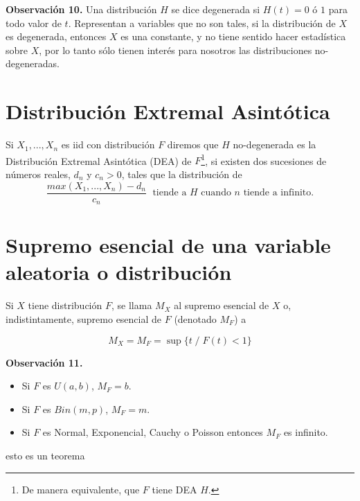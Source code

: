 \documentclass[
]{book}
\providecommand{\tightlist}{%
  \setlength{\itemsep}{0pt}\setlength{\parskip}{0pt}}
\theoremstyle{definition}
\theoremstyle{definition}
\theoremstyle{definition}
\theoremstyle{definition}
\theoremstyle{remark}
\begin{document}
\textbf{Observación 10.} Una distribución \(H\) se dice degenerada si \(H(t)=0 \text{ ó } 1\) para todo valor de \(t\). Representan a variables que no son tales, si la distribución de \(X\) es degenerada, entonces \(X\) es una constante, y no tiene sentido
hacer estadística sobre \(X\), por lo tanto sólo tienen
interés para nosotros las distribuciones no-degeneradas.

\section{Distribución Extremal Asintótica}\label{distribuciuxf3n-extremal-asintuxf3tica}

Si \(X_1,...,X_n\) es iid con distribución \(F\) diremos que \(H\) no-degenerada es la Distribución Extremal Asintótica
(DEA) de \(F\)\footnote{De manera equivalente, que \(F\) tiene DEA \(H\).}, si existen dos sucesiones de números reales, \(d_n\) y \(c_n>0\), tales que la distribución de
\begin{equation}
\frac{max(X_1,...,X_n)- d_n}{c_n}\;\text{ tiende a } H \text{ cuando } n \text{ tiende a infinito.}
\end{equation}

\section{Supremo esencial de una variable aleatoria o distribución}\label{supremo-esencial-de-una-variable-aleatoria-o-distribuciuxf3n}

Si \(X\) tiene distribución \(F\),
se llama \(M_X\) al supremo esencial de \(X\) o,
indistintamente, supremo esencial de \(F\) (denotado
\(M_F\)) a

\begin{equation}
M_X = M_F = \sup\{t \; / \; F(t) < 1\}
\end{equation}

\textbf{Observación 11.}

\begin{itemize}
\tightlist
\item
  Si \(F\) es \(U(a,b)\), \(M_F=b\).
\item
  Si \(F\) es \(Bin(m,p)\), \(M_F=m\).
\item
  Si \(F\) es Normal, Exponencial, Cauchy o Poisson entonces \(M_F\) es infinito.
\end{itemize}

\begin{teorema}
esto es un teorema
\end{teorema}
\end{document}
